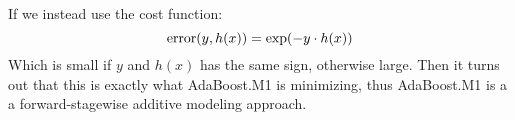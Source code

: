     If we instead use the cost function:
    \begin{equation*}
        \text{error}(y,h(x))=\exp(-y\cdot h(x))
    \end{equation*}
    Which is small if $y$ and $h(x)$ has the same sign, otherwise large. Then 
    it turns out that this is exactly what AdaBoost.M1 is minimizing, thus 
    AdaBoost.M1 is a a forward-stagewise additive modeling approach.
